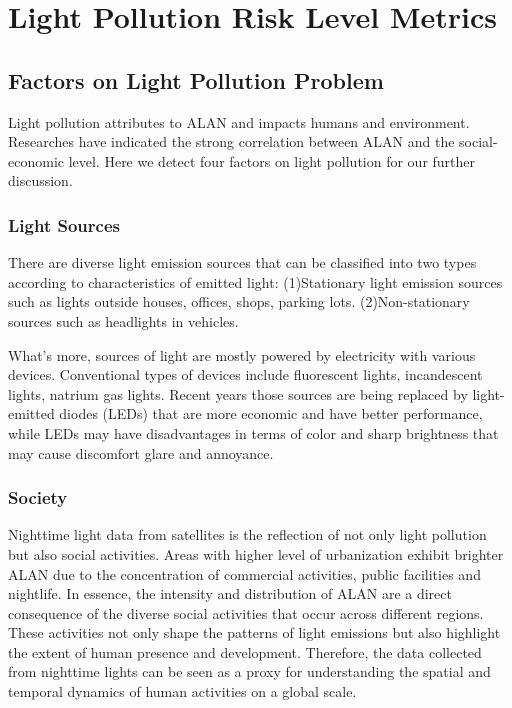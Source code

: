 \section{\textbf{Light Pollution Risk Level Metrics}}

\subsection{\textbf{Factors on Light Pollution Problem}}
Light pollution attributes to ALAN and impacts humans and environment. Researches have indicated the strong correlation between ALAN and the social-economic level. Here we detect four factors on light pollution for our further discussion.\par

\subsubsection{Light Sources}
There are diverse light emission sources that can be classified into two types according to characteristics of emitted light: (1)Stationary light emission sources such as lights outside houses, offices, shops, parking lots. (2)Non-stationary sources such as headlights in vehicles.\par
What's more, sources of light are mostly powered by electricity with various devices. Conventional types of devices include fluorescent lights, incandescent lights, natrium gas lights. Recent years those sources are being replaced by light-emitted diodes (LEDs) that are more economic and have better performance, while LEDs may have disadvantages in terms of color and sharp brightness that may cause discomfort glare and annoyance\textsuperscript{\cite{ref5}}. \par

\subsubsection{Society}
Nighttime light data from satellites is the reflection of not only light pollution but also social activities. Areas with higher level of urbanization exhibit brighter ALAN due to the concentration of commercial activities, public facilities and nightlife. In essence, the intensity and distribution of ALAN are a direct consequence of the diverse social activities that occur across different regions. These activities not only shape the patterns of light emissions but also highlight the extent of human presence and development. Therefore, the data collected from nighttime lights can be seen as a proxy for understanding the spatial and temporal dynamics of human activities on a global scale.\par 

